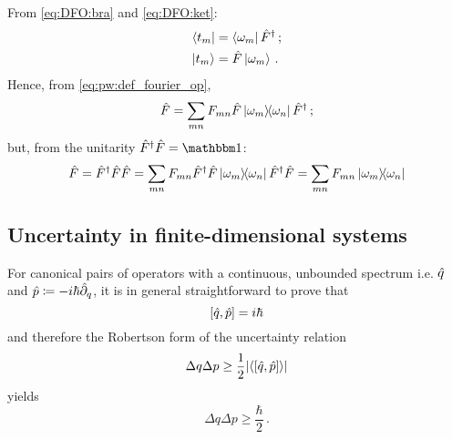 From \eqref{eq:DFO:bra} and \eqref{eq:DFO:ket}:
\begin{align}
  \bra{t_m} &= \bra{\omega_m}\hat{F}^{\dagger} \, \text{;} \\
  \ket{t_m} &= \hat{F} \ket{\omega_m} \, \text{.} 
\end{align}
Hence, from \eqref{eq:pw:def_fourier_op},
\begin{equation}
  \hat{F} = \sum_{mn} F_{mn} \hat{F} \ketbra{\omega_m}{\omega_n} \hat{F}^{\dagger} \, \text{;}
\end{equation}
but, from the unitarity $\op{F}^{\dagger}\op{F} = \idop$:
\begin{equation}
  \hat{F} = \hat{F}^{\dagger}\hat{F}\hat{F} = \sum_{mn} F_{mn} \hat{F}^{\dagger}\hat{F} \ketbra{\omega_m}{\omega_n} \hat{F}^{\dagger}\hat{F}
  = \sum_{mn} F_{mn} \ketbra{\omega_m}{\omega_n}
\end{equation}

\subsection{Uncertainty in finite-dimensional systems}\label{sec:finite_uncertainty}
\citereset
For canonical pairs of operators with a continuous, unbounded spectrum i.e.
$\hat{q}$ and $\hat{p} \coloneqq -i\hbar\hat{\partial}_{q}$,
it is in general straightforward to prove that
\begin{equation}\label{eq:commconstant}
  \qty[\hat{q}, \hat{p}] = i\hbar
\end{equation}
and therefore
the Robertson form of the uncertainty relation
\begin{equation}\label{eq:robertsonconstant}
  \Delta q \Delta p \geq { \frac{1}{2} \qty|\ev{\qty[\op{q}, \op{p}]}| }
\end{equation}
yields
\begin{equation}\label{eq:min_uncertain_constant}
  \Delta q \Delta p \geq { \frac{\hbar}{2} } \, \text{.}
\end{equation}

